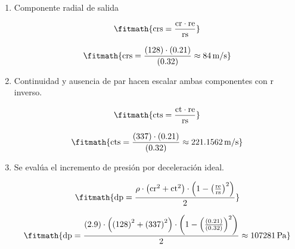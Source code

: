 \begin{enumerate}

\item Componente radial de salida

\[\fitmath{\mathrm{crs}=\frac{\mathrm{cr}\cdot \mathrm{re}}{\mathrm{rs}}}\]

\[\fitmath{\mathrm{crs}=\frac{(128)\cdot (0.21)}{(0.32)}\approx 84\,\mathrm{m/s}}\]

\item Continuidad y ausencia de par hacen escalar ambas componentes con r inverso.

\[\fitmath{\mathrm{cts}=\frac{\mathrm{ct}\cdot \mathrm{re}}{\mathrm{rs}}}\]

\[\fitmath{\mathrm{cts}=\frac{(337)\cdot (0.21)}{(0.32)}\approx 221.1562\,\mathrm{m/s}}\]

\item Se evalúa el incremento de presión por deceleración ideal.

\[\fitmath{\mathrm{dp}=\frac{\rho\cdot \left({\mathrm{cr}}^{2}+{\mathrm{ct}}^{2}\right)\cdot \left(1-{\left(\frac{\mathrm{re}}{\mathrm{rs}}\right)}^{2}\right)}{2}}\]

\[\fitmath{\mathrm{dp}=\frac{(2.9)\cdot \left({(128)}^{2}+{(337)}^{2}\right)\cdot \left(1-{\left(\frac{(0.21)}{(0.32)}\right)}^{2}\right)}{2}\approx 107281\,\mathrm{Pa}}\]

\end{enumerate}
